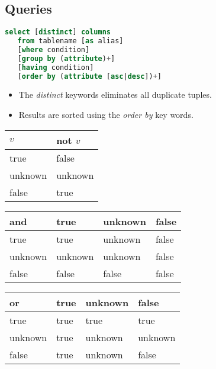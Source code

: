 

\subsection{Queries}


\begin{lstlisting}[language=sql]
select [distinct] columns
   from tablename [as alias]
   [where condition]
   [group by (attribute)+]
   [having condition]
   [order by (attribute [asc|desc])+]
\end{lstlisting}

\begin{itemize}
\item The \emph{distinct} keywords eliminates all duplicate tuples.
\item Results are sorted using the \emph{order by} key words.
\end{itemize}



\begin{center}
\begin{tabular}{|p{4em}|p{4em}|}\hline
$v$ & \bf not $v$ \\\hline
true       & false   \\
unknown    & unknown \\
false      & true    \\\hline
\end{tabular}
\end{center}

\begin{center}
\begin{tabular}{|p{4em}|p{4em}p{4em}p{4em}|}\hline
\bf and & true    & unknown & false   \\\hline
true    & true    & unknown & false   \\
unknown & unknown & unknown & false   \\
false   & false   & false   & false   \\\hline
\end{tabular}
\end{center}

\begin{center}
\begin{tabular}{|p{4em}|p{4em}p{4em}p{4em}|}\hline
\bf or  & true    & unknown & false   \\\hline
true    & true    & true    & true    \\
unknown & true    & unknown & unknown \\
false   & true    & unknown & false   \\\hline
\end{tabular}
\end{center}

